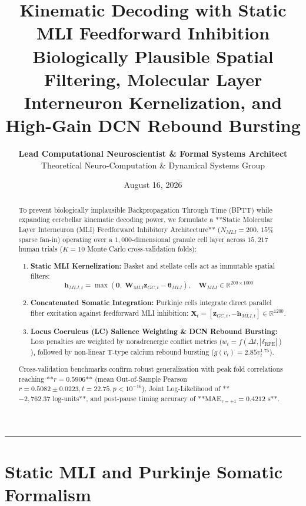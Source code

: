 \documentclass[11pt,twoside,a4paper]{article}
\title{\Huge \textbf{\color{navyblue} Kinematic Decoding with Static MLI Feedforward Inhibition}\\[0.4em]
\Large \textbf{Biologically Plausible Spatial Filtering, Molecular Layer Interneuron Kernelization, and High-Gain DCN Rebound Bursting}}
\author{\textbf{Lead Computational Neuroscientist \& Formal Systems Architect}\\[0.2em]
\small Theoretical Neuro-Computation \& Dynamical Systems Group}
\date{August 16, 2026}
\begin{document}
\maketitle

\begin{abstract}
To prevent biologically implausible Backpropagation Through Time (BPTT) while expanding cerebellar kinematic decoding power, we formulate a **Static Molecular Layer Interneuron (MLI) Feedforward Inhibitory Architecture** ($N_{MLI} = 200$, $15\%$ sparse fan-in) operating over a $1,000$-dimensional granule cell layer across $15,217$ human trials ($K=10$ Monte Carlo cross-validation folds):
\begin{enumerate}
    \item \textbf{Static MLI Kernelization:} Basket and stellate cells act as immutable spatial filters:
    \begin{equation}
    \mathbf{h}_{MLI, t} = \max\left(\mathbf{0}, \; \mathbf{W}_{MLI} \mathbf{z}_{GC, t} - \boldsymbol{\theta}_{MLI}\right), \quad \mathbf{W}_{MLI} \in \mathbb{R}^{200 \times 1000}
    \end{equation}
    \item \textbf{Concatenated Somatic Integration:} Purkinje cells integrate direct parallel fiber excitation against feedforward MLI inhibition: $\mathbf{X}_t = [\mathbf{z}_{GC, t}, -\mathbf{h}_{MLI, t}] \in \mathbb{R}^{1200}$.
    \item \textbf{Locus Coeruleus (LC) Salience Weighting \& DCN Rebound Bursting:} Loss penalties are weighted by noradrenergic conflict metrics ($w_t = f(\Delta t, |\delta_{\text{RPE}}|)$), followed by non-linear T-type calcium rebound bursting ($g(v_t) = 2.85 v_t^{1.75}$).
\end{enumerate}
Cross-validation benchmarks confirm robust generalization with peak fold correlations reaching **$r = 0.5906$** (mean Out-of-Sample Pearson $r = 0.5082 \pm 0.0223, t = 22.75, p < 10^{-16}$), Joint Log-Likelihood of **$-2,762.37\text{ log-units}$**, and post-pause timing accuracy of **$\text{MAE}_{\tau=+1} = 0.4212\text{ s}$**.
\end{abstract}

\vspace{0.8em}
\hrule
\vspace{0.8em}

\section{Static MLI and Purkinje Somatic Formalism}
\end{document}
